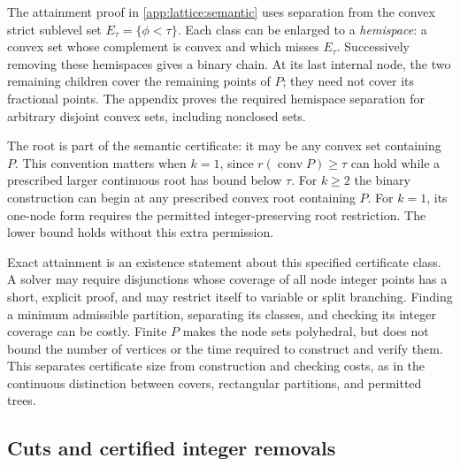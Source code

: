 The attainment proof in \cref{app:lattice:semantic} uses separation from the
convex strict sublevel set $E_\tau=\{\phi<\tau\}$. Each class can be
enlarged to a \emph{hemispace}: a convex set whose complement is convex and
which misses $E_\tau$. Successively removing these hemispaces gives a
binary chain. At its last internal node, the two remaining children cover
the remaining points of $P$; they need not cover its fractional points.
The appendix proves the required hemispace separation for arbitrary
disjoint convex sets, including nonclosed sets.

The root is part of the semantic certificate: it may be any convex set
containing $P$. This convention matters when $k=1$, since
$r(\operatorname{conv}P)\ge\tau$ can hold while a prescribed larger
continuous root has bound below $\tau$. For $k\ge2$ the binary construction
can begin at any prescribed convex root containing $P$. For $k=1$, its
one-node form requires the permitted integer-preserving root restriction.
The lower bound holds without this extra permission.

Exact attainment is an existence statement about this specified certificate
class. A solver may require disjunctions whose coverage of all node integer
points has a short, explicit proof, and may restrict itself to variable or
split branching. Finding a minimum admissible partition, separating its
classes, and checking its integer coverage can be costly. Finite $P$ makes
the node sets polyhedral, but does not bound the number of vertices or the
time required to construct and verify them. This separates certificate size
from construction and checking costs, as in the continuous distinction
between covers, rectangular partitions, and permitted trees.

\subsection{Cuts and certified integer removals}

